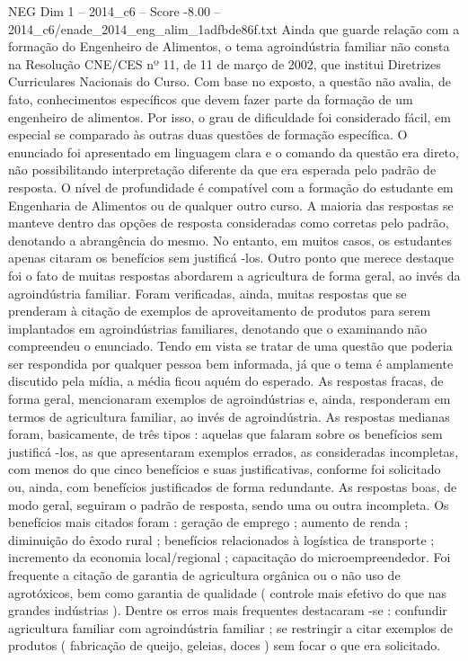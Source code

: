 \begin{textsample}{NEG Dim 1 – 2014\_c6 – Score -8.00 – 2014\_c6/enade\_2014\_eng\_alim\_1adfbde86f.txt}
Ainda que guarde relação com a formação do Engenheiro de Alimentos, o tema agroindústria familiar não consta na Resolução CNE/CES nº 11, de 11 de março de 2002, que institui Diretrizes Curriculares Nacionais do Curso.
Com base no exposto, a questão não avalia, de fato, conhecimentos específicos que devem fazer parte da formação de um engenheiro de alimentos.
Por isso, o grau de dificuldade foi considerado fácil, em especial se comparado às outras duas questões de formação específica.
O enunciado foi apresentado em linguagem clara e o comando da questão era direto, não possibilitando interpretação diferente da que era esperada pelo padrão de resposta.
O nível de profundidade é compatível com a formação do estudante em Engenharia de Alimentos ou de qualquer outro curso.
A maioria das respostas se manteve dentro das opções de resposta consideradas como corretas pelo padrão, denotando a abrangência do mesmo.
No entanto, em muitos casos, os estudantes apenas citaram os benefícios sem justificá -los.
Outro ponto que merece destaque foi o fato de muitas respostas abordarem a agricultura de forma geral, ao invés da agroindústria familiar.
Foram verificadas, ainda, muitas respostas que se prenderam à citação de exemplos de aproveitamento de produtos para serem implantados em agroindústrias familiares, denotando que o examinando não compreendeu o enunciado.
Tendo em vista se tratar de uma questão que poderia ser respondida por qualquer pessoa bem informada, já que o tema é amplamente discutido pela mídia, a média ficou aquém do esperado.
As respostas fracas, de forma geral, mencionaram exemplos de agroindústrias e, ainda, responderam em termos de agricultura familiar, ao invés de agroindústria.
As respostas medianas foram, basicamente, de três tipos : aquelas que falaram sobre os benefícios sem justificá -los, as que apresentaram exemplos errados, as consideradas incompletas, com menos do que cinco benefícios e suas justificativas, conforme foi solicitado ou, ainda, com benefícios justificados de forma redundante.
As respostas boas, de modo geral, seguiram o padrão de resposta, sendo uma ou outra incompleta.
Os benefícios mais citados foram : geração de emprego ; aumento de renda ; diminuição do êxodo rural ; benefícios relacionados à logística de transporte ; incremento da economia local/regional ; capacitação do microempreendedor.
Foi frequente a citação de garantia de agricultura orgânica ou o não uso de agrotóxicos, bem como garantia de qualidade ( controle mais efetivo do que nas grandes indústrias ).
Dentre os erros mais frequentes destacaram -se : confundir agricultura familiar com agroindústria familiar ; se restringir a citar exemplos de produtos ( fabricação de queijo, geleias, doces ) sem focar o que era solicitado.

\end{textsample}
